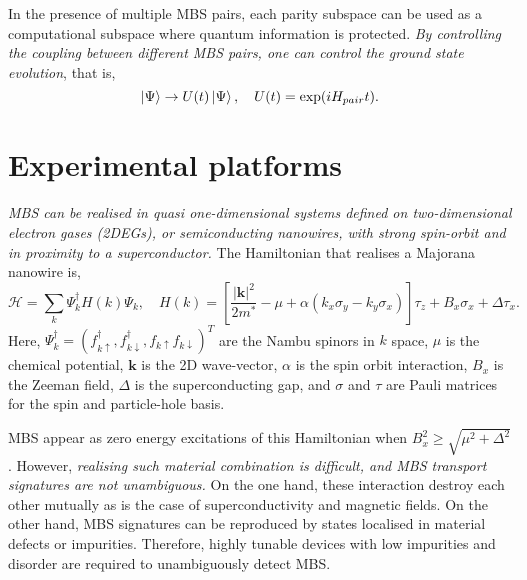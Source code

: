 In the presence of multiple MBS pairs, each parity subspace can be used as a computational subspace where quantum information is protected.
\textit{By controlling the coupling between different MBS pairs, one can control the ground state evolution}, that is,
\begin{equation}
\ket{\Psi} \rightarrow U(t)\ket{\Psi}, \quad U(t) = \exp(iH_{pair} t).
\end{equation}

\section{Experimental platforms}

\textit{MBS can be realised in quasi one-dimensional systems defined on two-dimensional electron gases (2DEGs), or semiconducting nanowires, with strong spin-orbit and in proximity to a superconductor.}
The Hamiltonian that realises a Majorana nanowire is,
\begin{equation}
\mathcal{H} = \sum_k \Psi_k^\dagger H(k) \Psi_k  ,\quad H(k) =  \left[ \frac{|\mathbf{k}|^2}{2 m^*} - \mu + \alpha(k_x \sigma_y - k_y \sigma_x) \right] \tau_z + B_x \sigma_x  + \Delta \tau_x.
\end{equation}
Here, $\Psi_k^\dagger = (f_{k\uparrow}^\dagger, f_{k\downarrow}^\dagger, f_{k\uparrow} f_{k\downarrow})^T$ are the Nambu spinors in $k$ space, $\mu$ is the chemical potential, $\mathbf{k}$ is the 2D wave-vector, $\alpha$ is the spin orbit interaction, $B_x$ is the Zeeman field, $\Delta$ is the superconducting gap, and $\sigma$ and $\tau$ are Pauli matrices for the spin and particle-hole basis.

MBS appear as zero energy excitations of this Hamiltonian when $B_x^2 \geq \sqrt{\mu^2 + \Delta^2}$.
However, \textit{realising such material combination is difficult, and MBS transport signatures are not unambiguous.}
On the one hand, these interaction destroy each other mutually as is the case of superconductivity and magnetic fields.
On the other hand, MBS signatures can be reproduced by states localised in material defects or impurities.
Therefore, highly tunable devices with low impurities and disorder are required to unambiguously detect MBS.

